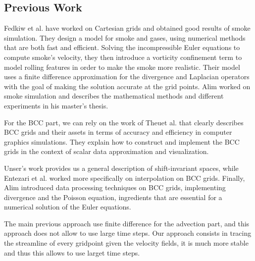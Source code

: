 \documentclass[accepted,single]{gipaper}
\begin{document}
\subsection{Previous Work}

Fedkiw et al. \cite{Fedkiw:2001} have worked on Cartesian grids and obtained good results of smoke simulation. They design a model for smoke and gases, using numerical methods that are both fast and efficient. Solving the incompressible Euler equations to compute smoke's velocity, they then introduce a vorticity confinement term to model rolling features in order to make the smoke more realistic. Their model uses a finite difference approximation for the divergence and Laplacian operators with the goal of making the solution accurate at the grid points.
Alim \cite{alim:ms} worked on smoke simulation and describes the mathematical methods and different experiments in his master's thesis.

For the BCC part, we can rely on the work of Theu et al. \cite{TheuBl:2001} that clearly describes BCC grids and their assets in terms of accuracy and efficiency in computer graphics simulations. They explain how to construct and implement the BCC grids in the context of scalar data approximation and visualization.

Unser's work \cite{Unser:2000} provides us a general description of shift-invariant spaces, while Entezari et al. \cite{Entezari:2008} worked more specifically on interpolation on BCC grids.
Finally, Alim \cite{alim:phd} introduced data processing techniques on BCC grids, implementing divergence and the Poisson equation, ingredients that are essential for a numerical solution of the Euler equations.


The main previous approach use finite difference for the advection part, and this approach does not allow to use large time steps. Our approach consists in tracing the streamline of every gridpoint given the velocity fields, it is much more stable and thus this allows to use larget time steps.
\end{document}

